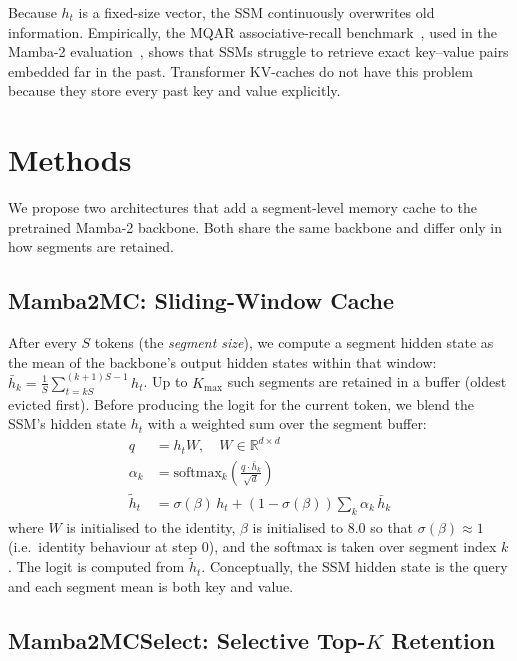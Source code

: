\documentclass{article}
\begin{document}
Because $h_t$ is a fixed-size vector, the SSM continuously overwrites old information. Empirically, the MQAR associative-recall benchmark~\citep{arora2023zoologymeasuringimprovingrecall}, used in the Mamba-2 evaluation~\citep{dao2024transformersssmsgeneralizedmodels}, shows that SSMs struggle to retrieve exact key--value pairs embedded far in the past. Transformer KV-caches do not have this problem because they store every past key and value explicitly.

\section{Methods}
\label{sec:methods}

We propose two architectures that add a segment-level memory cache to the pretrained Mamba-2 backbone. Both share the same backbone and differ only in how segments are retained.

\subsection{Mamba2MC: Sliding-Window Cache}
\label{sec:mc}

After every $S$ tokens (the \emph{segment size}), we compute a segment hidden state as the mean of the backbone's output hidden states within that window: $\bar{h}_k = \frac{1}{S}\sum_{t=kS}^{(k+1)S-1} h_t$. Up to $K_{\max}$ such segments are retained in a buffer (oldest evicted first). Before producing the logit for the current token, we blend the SSM's hidden state $h_t$ with a weighted sum over the segment buffer:
\begin{align}
    q &= h_t W,\quad W \in \mathbb{R}^{d \times d} \label{eq:query} \\
    \alpha_k &= \mathrm{softmax}_k\!\left(\frac{q \cdot \bar{h}_k}{\sqrt{d}}\right) \label{eq:scores} \\
    \tilde{h}_t &= \sigma(\beta)\, h_t + (1 - \sigma(\beta))\sum_{k} \alpha_k\, \bar{h}_k \label{eq:mix}
\end{align}
where $W$ is initialised to the identity, $\beta$ is initialised to $8.0$ so that $\sigma(\beta)\approx 1$ (i.e.\ identity behaviour at step 0), and the softmax is taken over segment index $k$. The logit is computed from $\tilde{h}_t$. Conceptually, the SSM hidden state is the query and each segment mean is both key and value.

\subsection{Mamba2MCSelect: Selective Top-$K$ Retention}
\label{sec:mcselect}
\end{document}
